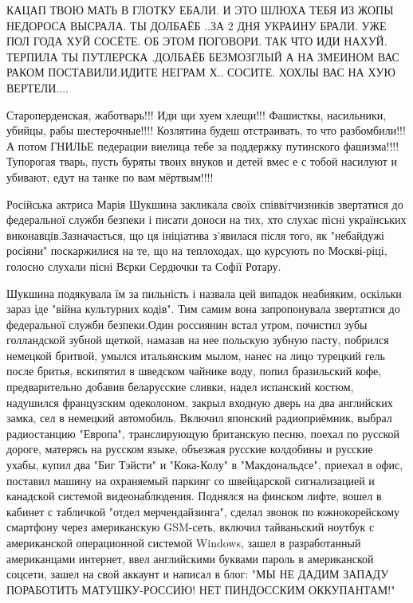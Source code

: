 КАЦАП ТВОЮ МАТЬ В ГЛОТКУ ЕБАЛИ. И ЭТО ШЛЮХА ТЕБЯ ИЗ ЖОПЫ НЕДОРОСА ВЫСРАЛА. ТЫ
ДОЛБАЁБ ..ЗА 2 ДНЯ УКРАИНУ БРАЛИ. УЖЕ ПОЛ ГОДА ХУЙ СОСЁТЕ. ОБ ЭТОМ ПОГОВОРИ.
ТАК ЧТО ИДИ НАХУЙ. ТЕРПИЛА ТЫ ПУТЛЕРСКА .ДОЛБАЁБ БЕЗМОЗГЛЫЙ А НА ЗМЕИНОМ ВАС
РАКОМ ПОСТАВИЛИ.ИДИТЕ НЕГРАМ Х.. СОСИТЕ. ХОХЛЫ ВАС НА ХУЮ ВЕРТЕЛИ....

Староперденская, жаботварь!!! Иди щи хуем хлещи!!! Фашисткы, насильники,
убийцы, рабы шестерочные!!!! Козлятина будеш отстраивать, то что разбомбили!!!
А потом ГНИЛЬЕ педерации виелица тебе за поддержку путинского фашизма!!!!
Тупорогая тварь, пусть буряты твоих внуков и детей вмес е с тобой насилуют и
убивают, едут на танке по вам мёртвым!!!!


Російська актриса Марія Шукшина закликала своїх співвітчизників звертатися до
федеральної служби безпеки і писати доноси на тих, хто слухає пісні українських
виконавців.Зазначається, що ця ініціатива з'явилася після того, як "небайдужі
росіяни" поскаржилися на те, що на теплоходах, що курсують по Москві-ріці,
голосно слухали пісні Вєрки Сердючки та Софії Ротару.

Шукшина подякувала їм за пильність і назвала цей випадок неабияким, оскільки
зараз іде "війна культурних кодів". Тим самим вона запропонувала звертатися до
федеральної служби безпеки.Один россиянин встал утром, почистил зубы
голландской зубной щеткой, намазав на нее польскую зубную пасту, побрился
немецкой бритвой, умылся итальянским мылом, нанес на лицо турецкий гель после
бритья, вскипятил в шведском чайнике воду, попил бразильский кофе,
предварительно добавив беларусские сливки, надел испанский костюм, надушился
французским одеколоном, закрыл входную дверь на два английских замка, сел в
немецкий автомобиль. Включил японский радиоприёмник, выбрал радиостанцию
"Европа", транслирующую британскую песню, поехал по русской дороге, матерясь на
русском языке, объезжая русские колдобины и русские ухабы, купил два "Биг
Тэйсти" и "Кока-Колу" в "Макдональдсе", приехал в офис, поставил машину на
охраняемый паркинг со швейцарской сигнализацией и канадской системой
видеонаблюдения. Поднялся на финском лифте, вошел в кабинет с табличкой "отдел
мерчендайзинга", сделал звонок по южнокорейскому смартфону через американскую
GSM-сеть, включил тайваньский ноутбук с американской операционной системой
Windows, зашел в разработанный американцами интернет, ввел английскими буквами
пароль в американской соцсети, зашел на свой аккаунт и написал в блог: "МЫ НЕ
ДАДИМ ЗАПАДУ ПОРАБОТИТЬ МАТУШКУ-РОССИЮ! НЕТ ПИНДОССКИМ ОККУПАНТАМ!" 

